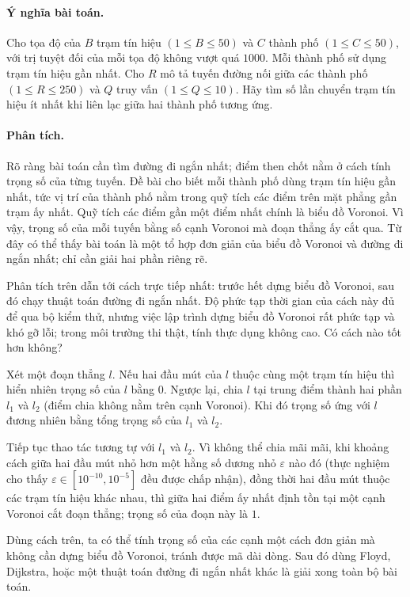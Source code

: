 \documentclass[11pt]{article}
\begin{document}
\paragraph{Ý nghĩa bài toán.}
Cho tọa độ của \(B\) trạm tín hiệu \((1\le B\le 50)\) và \(C\) thành phố
\((1\le C\le 50)\), với trị tuyệt đối của mỗi tọa độ không vượt quá \(1000\).
Mỗi thành phố sử dụng trạm tín hiệu gần nhất. Cho \(R\) mô tả tuyến đường nối
giữa các thành phố \((1\le R\le 250)\) và \(Q\) truy vấn \((1\le Q\le 10)\).
Hãy tìm số lần chuyển trạm tín hiệu ít nhất khi liên lạc giữa hai thành phố
tương ứng.

\paragraph{Phân tích.}
Rõ ràng bài toán cần tìm đường đi ngắn nhất; điểm then chốt nằm ở cách tính
trọng số của từng tuyến. Đề bài cho biết mỗi thành phố dùng trạm tín hiệu gần
nhất, tức vị trí của thành phố nằm trong quỹ tích các điểm trên mặt phẳng gần
trạm ấy nhất. Quỹ tích các điểm gần một điểm nhất chính là biểu đồ Voronoi.
Vì vậy, trọng số của mỗi tuyến bằng số cạnh Voronoi mà đoạn thẳng ấy cắt qua.
Từ đây có thể thấy bài toán là một tổ hợp đơn giản của biểu đồ Voronoi và
đường đi ngắn nhất; chỉ cần giải hai phần riêng rẽ.

Phân tích trên dẫn tới cách trực tiếp nhất: trước hết dựng biểu đồ Voronoi,
sau đó chạy thuật toán đường đi ngắn nhất. Độ phức tạp thời gian của cách này
đủ để qua bộ kiểm thử, nhưng việc lập trình dựng biểu đồ Voronoi rất phức tạp
và khó gỡ lỗi; trong môi trường thi thật, tính thực dụng không cao. Có cách
nào tốt hơn không?

Xét một đoạn thẳng \(l\). Nếu hai đầu mút của \(l\) thuộc cùng một trạm tín
hiệu thì hiển nhiên trọng số của \(l\) bằng \(0\). Ngược lại, chia \(l\) tại
trung điểm thành hai phần \(l_1\) và \(l_2\) (điểm chia không nằm trên cạnh
Voronoi). Khi đó trọng số ứng với \(l\) đương nhiên bằng tổng trọng số của
\(l_1\) và \(l_2\).

Tiếp tục thao tác tương tự với \(l_1\) và \(l_2\). Vì không thể chia mãi mãi,
khi khoảng cách giữa hai đầu mút nhỏ hơn một hằng số dương nhỏ \(\varepsilon\)
nào đó (thực nghiệm cho thấy \(\varepsilon\in[10^{-10},10^{-5}]\) đều được
chấp nhận), đồng thời hai đầu mút thuộc các trạm tín hiệu khác nhau, thì giữa
hai điểm ấy nhất định tồn tại một cạnh Voronoi cắt đoạn thẳng; trọng số của
đoạn này là \(1\).

Dùng cách trên, ta có thể tính trọng số của các cạnh một cách đơn giản mà
không cần dựng biểu đồ Voronoi, tránh được mã dài dòng. Sau đó dùng Floyd,
Dijkstra, hoặc một thuật toán đường đi ngắn nhất khác là giải xong toàn bộ
bài toán.
\end{document}
